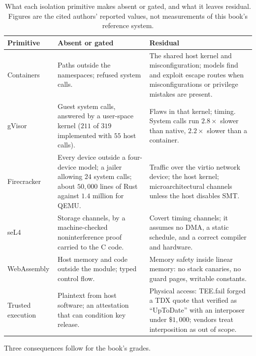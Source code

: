 \begin{table}[H]
\centering
\caption{What each isolation primitive makes absent or gated, and what it
leaves residual. Figures are the cited authors' reported values, not
measurements of this book's reference system.}
\label{tab:app-isolation-primitives}
\footnotesize
\begin{tabularx}{\textwidth}{@{}>{\raggedright\arraybackslash}p{} >{\raggedright\arraybackslash}X >{\raggedright\arraybackslash}X@{}}
\toprule
\textbf{Primitive} & \textbf{Absent or gated} & \textbf{Residual} \\
\midrule
Containers & Paths outside the namespaces; refused system calls. & The shared host kernel and misconfiguration; models find and exploit escape routes when misconfigurations or privilege mistakes are present. \\
gVisor & Guest system calls, answered by a user-space kernel ($211$ of $319$ implemented with $55$ host calls). & Flaws in that kernel; timing. System calls run $2.8\times$ slower than native, $2.2\times$ slower than a container. \\
Firecracker & Every device outside a four-device model; a jailer allowing $24$ system calls; about $50{,}000$ lines of Rust against $1.4$ million for QEMU. & Traffic over the virtio network device; the host kernel; microarchitectural channels unless the host disables SMT. \\
seL4 & Storage channels, by a machine-checked noninterference proof carried to the C code. & Covert timing channels; it assumes no DMA, a static schedule, and a correct compiler and hardware. \\
Web\-Assembly & Host memory and code outside the module; typed control flow. & Memory safety inside linear memory: no stack canaries, no guard pages, writable constants. \\
Trusted execution & Plaintext from host software; an attestation that can condition key release. & Physical access: TEE.fail forged a TDX quote that verified as ``UpToDate'' with an interposer under $\$1{,}000$; vendors treat interposition as out of scope. \\
\bottomrule
\end{tabularx}
\end{table}

Three consequences follow for the book's grades.

